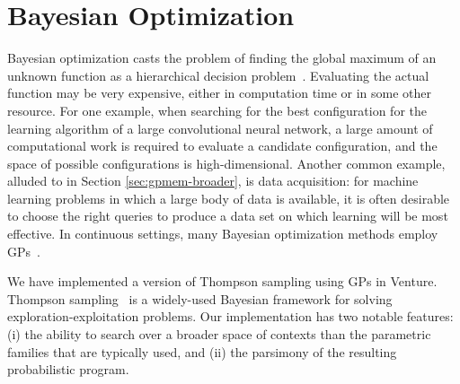 \documentclass{article} %
\begin{document}
\FloatBarrier
\section{Bayesian Optimization}\label{sec:bayesopt}
Bayesian optimization casts the problem of finding the global maximum of an unknown function as a hierarchical decision problem~\citep{ghahramani2015probabilistic}.
Evaluating the actual function may be very expensive, either in computation time or in some other resource.
For one example, when searching for the best configuration for the learning algorithm of a large convolutional neural network, a large amount of computational work is required to evaluate a candidate configuration, and the space of possible configurations is high-dimensional.
Another common example, alluded to in Section \ref{sec:gpmem-broader}, is data acquisition: for machine learning problems in which a large body of data is available, it is often desirable to choose the right queries to produce a data set on which learning will be most effective.
In continuous settings, many Bayesian optimization methods employ GPs~\citep[e.g.][]{snoek2012practical}.

We have implemented a version of Thompson sampling using GPs in Venture.
Thompson sampling~\cite{thompson1933likelihood} is a widely-used Bayesian framework for solving exploration-exploitation problems.
Our implementation has two notable features: (i) the ability to search over a broader space of contexts than the parametric families that are typically used, and (ii) the parsimony of the resulting probabilistic program.
\end{document}
